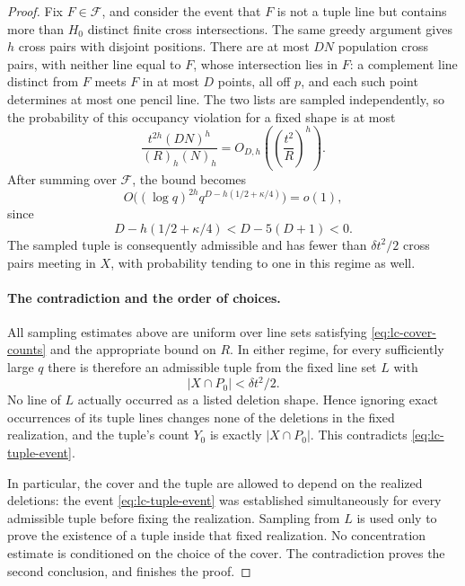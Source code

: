 \begin{proof}
Fix $F\in\mathcal F$, and consider the event that $F$ is not a tuple
line but contains more than $H_0$ distinct finite cross intersections.
The same greedy argument gives $h$ cross pairs with disjoint
positions. There are at most
$DN$ population cross pairs, with neither line equal to $F$, whose
intersection lies in $F$: a complement line distinct from $F$ meets
$F$ in at most $D$ points, all off $p$, and each such point determines
at most one pencil line. The two lists are sampled independently, so
the probability of this occupancy violation for a fixed shape is at
most
\begin{equation}\label{eq:lc-high-shape}
 \frac{t^{2h}(DN)^h}{(R)_h(N)_h}
 =O_{D,h}\left(\left(\frac{t^2}{R}\right)^h\right).
\end{equation}
After summing over $\mathcal F$, the bound becomes
\[
 O\bigl((\log q)^{2h}q^{D-h(1/2+\kappa/4)}\bigr)=o(1),
\]
since
\[
 D-h(1/2+\kappa/4)<D-5(D+1)<0.
\]
The sampled tuple is consequently admissible and has fewer than
$\delta t^2/2$ cross pairs meeting in $X$, with probability tending
to one in this regime as well.

\paragraph{The contradiction and the order of choices.}
All sampling estimates above are uniform over line sets satisfying
\eqref{eq:lc-cover-counts} and the appropriate bound on $R$. In either
regime, for every sufficiently large $q$ there is therefore an
admissible tuple from the fixed line set $L$ with
\[
 |X\cap P_0|<\delta t^2/2.
\]
No line of $L$ actually occurred as a listed deletion shape. Hence
ignoring exact occurrences of its tuple lines changes none of the
deletions in the fixed realization, and the tuple's count $Y_0$ is
exactly $|X\cap P_0|$. This contradicts
\eqref{eq:lc-tuple-event}.

In particular, the cover and the tuple are allowed to depend on the
realized deletions: the event \eqref{eq:lc-tuple-event} was established
simultaneously for every admissible tuple before fixing the
realization. Sampling from $L$ is used only to prove the existence of
a tuple inside that fixed realization. No concentration estimate is
conditioned on the choice of the cover. The contradiction proves the
second conclusion, and finishes the proof.
\end{proof}
